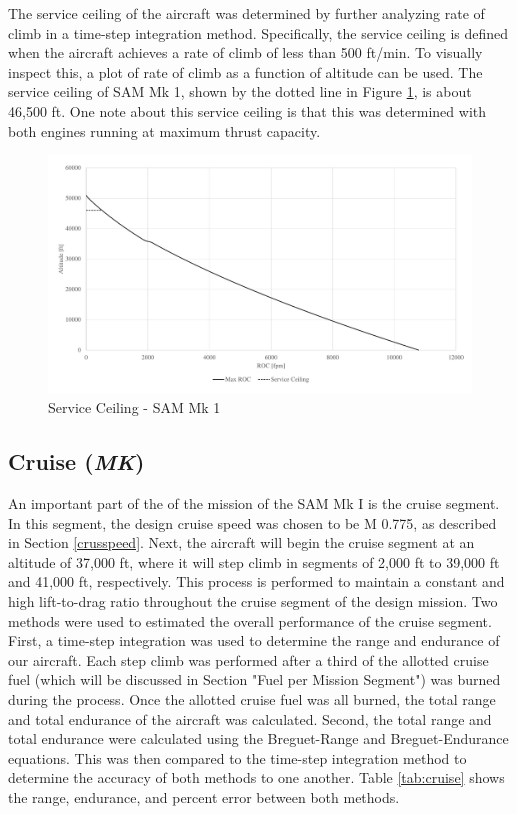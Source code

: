 The service ceiling of the aircraft was determined by further analyzing rate of climb in a time-step integration method. Specifically, the service ceiling is defined when the aircraft achieves a rate of climb of less than 500 ft/min. To visually inspect this, a plot of rate of climb as a function of altitude can be used. The service ceiling of SAM Mk 1, shown by the dotted line in Figure \ref{serceil}, is about 46,500 ft. One note about this service ceiling is that this was determined with both engines running at maximum thrust capacity.  

\begin{figure}[H]
    \centering
    \includegraphics[width=1.0\textwidth]{Photos/Service_Ceiling.pdf}
    \caption{Service Ceiling -  SAM Mk 1}
    \label{serceil}
 \end{figure}

\subsection{Cruise (\textit{MK})}
An important part of the of the mission of the SAM Mk I is the cruise segment. In this segment, the design cruise speed was chosen to be M 0.775, as described in Section \ref{crusspeed}. Next, the aircraft will begin the cruise segment at an altitude of 37,000 ft, where it will step climb in segments of 2,000 ft to 39,000 ft and 41,000 ft, respectively. This process is performed to maintain a constant and high lift-to-drag ratio throughout the cruise segment of the design mission. Two methods were used to estimated the overall performance of the cruise segment. First, a time-step integration was used to determine the range and endurance of our aircraft. Each step climb was performed after a third of the allotted cruise fuel (which will be discussed in Section "Fuel per Mission Segment") was burned during the process. Once the allotted cruise fuel was all burned, the total range and total endurance of the aircraft was calculated. Second, the total range and total endurance were calculated using the Breguet-Range and Breguet-Endurance equations. This was then compared to the time-step integration method to determine the accuracy of both methods to one another. Table \ref{tab:cruise} shows the range, endurance, and percent error between both methods. 

